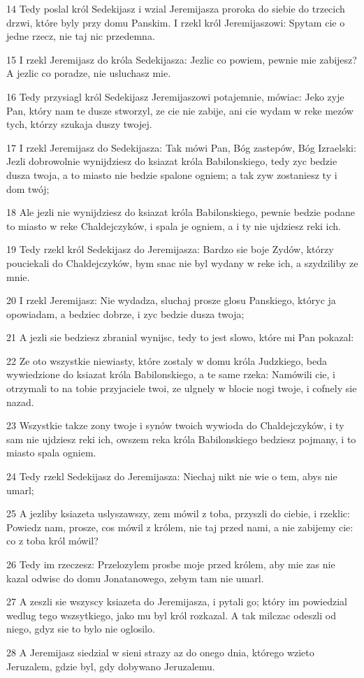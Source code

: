 \par 14 Tedy poslal król Sedekijasz i wzial Jeremijasza proroka do siebie do trzecich drzwi, które byly przy domu Panskim. I rzekl król Jeremijaszowi: Spytam cie o jedne rzecz, nie taj nic przedemna.
\par 15 I rzekl Jeremijasz do króla Sedekijasza: Jezlic co powiem, pewnie mie zabijesz? A jezlic co poradze, nie usluchasz mie.
\par 16 Tedy przysiagl król Sedekijasz Jeremijaszowi potajemnie, mówiac: Jeko zyje Pan, który nam te dusze stworzyl, ze cie nie zabije, ani cie wydam w reke mezów tych, którzy szukaja duszy twojej.
\par 17 I rzekl Jeremijasz do Sedekijasza: Tak mówi Pan, Bóg zastepów, Bóg Izraelski: Jezli dobrowolnie wynijdziesz do ksiazat króla Babilonskiego, tedy zyc bedzie dusza twoja, a to miasto nie bedzie spalone ogniem; a tak zyw zostaniesz ty i dom twój;
\par 18 Ale jezli nie wynijdziesz do ksiazat króla Babilonskiego, pewnie bedzie podane to miasto w reke Chaldejczyków, i spala je ogniem, a i ty nie ujdziesz reki ich.
\par 19 Tedy rzekl król Sedekijasz do Jeremijasza: Bardzo sie boje Zydów, którzy pouciekali do Chaldejczyków, bym snac nie byl wydany w reke ich, a szydziliby ze mnie.
\par 20 I rzekl Jeremijasz: Nie wydadza, sluchaj prosze glosu Panskiego, któryc ja opowiadam, a bedziec dobrze, i zyc bedzie dusza twoja;
\par 21 A jezli sie bedziesz zbranial wynijsc, tedy to jest slowo, które mi Pan pokazal:
\par 22 Ze oto wszystkie niewiasty, które zostaly w domu króla Judzkiego, beda wywiedzione do ksiazat króla Babilonskiego, a te same rzeka: Namówili cie, i otrzymali to na tobie przyjaciele twoi, ze ulgnely w blocie nogi twoje, i cofnely sie nazad.
\par 23 Wszystkie takze zony twoje i synów twoich wywioda do Chaldejczyków, i ty sam nie ujdziesz reki ich, owszem reka króla Babilonskiego bedziesz pojmany, i to miasto spala ogniem.
\par 24 Tedy rzekl Sedekijasz do Jeremijasza: Niechaj nikt nie wie o tem, abys nie umarl;
\par 25 A jezliby ksiazeta uslyszawszy, zem mówil z toba, przyszli do ciebie, i rzeklic: Powiedz nam, prosze, cos mówil z królem, nie taj przed nami, a nie zabijemy cie: co z toba król mówil?
\par 26 Tedy im rzeczesz: Przelozylem prosbe moje przed królem, aby mie zas nie kazal odwisc do domu Jonatanowego, zebym tam nie umarl.
\par 27 A zeszli sie wszyscy ksiazeta do Jeremijasza, i pytali go; który im powiedzial wedlug tego wszsytkiego, jako mu byl król rozkazal. A tak milczac odeszli od niego, gdyz sie to bylo nie oglosilo.
\par 28 A Jeremijasz siedzial w sieni strazy az do onego dnia, którego wzieto Jeruzalem, gdzie byl, gdy dobywano Jeruzalemu.

